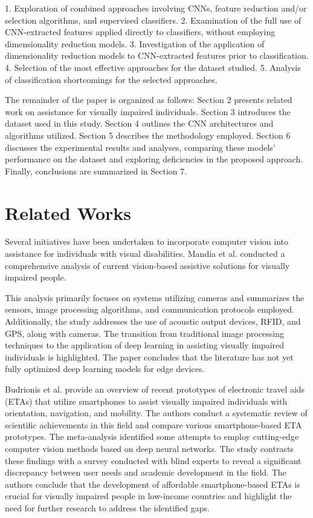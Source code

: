\documentclass[preprint,12pt]{elsarticle}
\begin{document}
1. Exploration of combined approaches involving CNNs, feature reduction and/or selection algorithms, and supervised classifiers.
2. Examination of the full use of CNN-extracted features applied directly to classifiers, without employing dimensionality reduction models.
3. Investigation of the application of dimensionality reduction models to CNN-extracted features prior to classification.
4. Selection of the most effective approaches for the dataset studied.
5. Analysis of classification shortcomings for the selected approaches.

The remainder of the paper is organized as follows: Section 2 presents related work on assistance for visually impaired individuals. Section 3 introduces the dataset used in this study. Section 4 outlines the CNN architectures and algorithms utilized. Section 5 describes the methodology employed. Section 6 discusses the experimental results and analyses, comparing these models' performance on the dataset and exploring deficiencies in the proposed approach. Finally, conclusions are summarized in Section 7. 

\section{Related Works}\label{sec:works}

Several initiatives have been undertaken to incorporate computer vision into assistance for individuals with visual disabilities. Mandia et al. \cite{mandia2023} conducted a comprehensive analysis of current vision-based assistive solutions for visually impaired people.

This analysis primarily focuses on systems utilizing cameras and summarizes the sensors, image processing algorithms, and communication protocols employed. Additionally, the study addresses the use of acoustic output devices, RFID, and GPS, along with cameras. The transition from traditional image processing techniques to the application of deep learning in assisting visually impaired individuals is highlighted. The paper concludes that the literature has not yet fully optimized deep learning models for edge devices.

Budrionis et al. \cite{budrionis2022} provide an overview of recent prototypes of electronic travel aids (ETAs) that utilize smartphones to assist visually impaired individuals with orientation, navigation, and mobility. The authors conduct a systematic review of scientific achievements in this field and compare various smartphone-based ETA prototypes. The meta-analysis identified some attempts to employ cutting-edge computer vision methods based on deep neural networks. The study contrasts these findings with a survey conducted with blind experts to reveal a significant discrepancy between user needs and academic development in the field. The authors conclude that the development of affordable smartphone-based ETAs is crucial for visually impaired people in low-income countries and highlight the need for further research to address the identified gaps.
\end{document}
